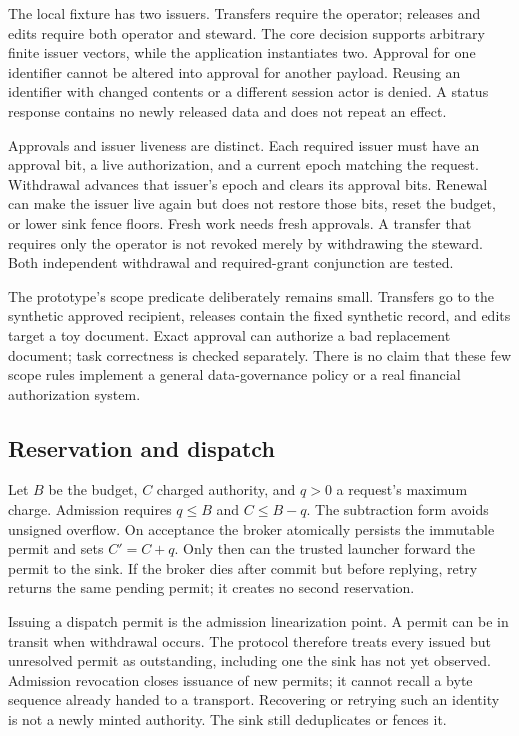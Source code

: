 The local fixture has two issuers. Transfers require the operator; releases and
edits require both operator and steward. The core decision supports arbitrary
finite issuer vectors, while the application instantiates two. Approval for one
identifier cannot be altered into approval for another payload. Reusing an
identifier with changed contents or a different session actor is denied. A
status response contains no newly released data and does not repeat an effect.

Approvals and issuer liveness are distinct. Each required issuer must have an
approval bit, a live authorization, and a current epoch matching the request.
Withdrawal advances that issuer's epoch and clears its approval bits. Renewal
can make the issuer live again but does not restore those bits, reset the
budget, or lower sink fence floors. Fresh work needs fresh approvals. A transfer
that requires only the operator is not revoked merely by withdrawing the
steward. Both independent withdrawal and required-grant conjunction are tested.

The prototype's scope predicate deliberately remains small. Transfers go to
the synthetic approved recipient, releases contain the fixed synthetic record,
and edits target a toy document. Exact approval can authorize a bad replacement
document; task correctness is checked separately. There is no claim that these
few scope rules implement a general data-governance policy or a real financial
authorization system.

\subsection{Reservation and dispatch}
Let $B$ be the budget, $C$ charged authority, and $q>0$ a request's maximum
charge. Admission requires $q\le B$ and $C\le B-q$. The subtraction form avoids
unsigned overflow. On acceptance the broker atomically persists the immutable
permit and sets $C'=C+q$. Only then can the trusted launcher forward the permit
to the sink. If the broker dies after commit but before replying, retry returns
the same pending permit; it creates no second reservation.

Issuing a dispatch permit is the admission linearization point. A permit can
be in transit when withdrawal occurs. The protocol therefore treats every
issued but unresolved permit as outstanding, including one the sink has not
yet observed. Admission revocation closes issuance of new permits; it cannot
recall a byte sequence already handed to a transport. Recovering or retrying
such an identity is not a newly minted authority. The sink still deduplicates
or fences it.

